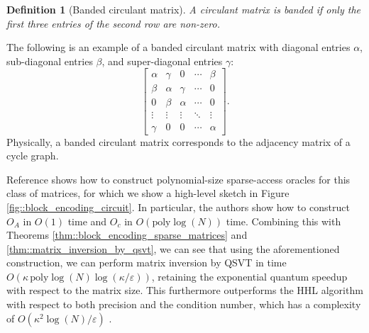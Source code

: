 \documentclass[10pt, twocolumn]{article}
\newtheorem{definition}[theorem]{Definition}
\begin{document}
\begin{definition}[Banded circulant matrix]
	A circulant matrix is banded if only the first three entries of the second row are non-zero.
\end{definition}

The following is an example of a banded circulant matrix with diagonal entries $\alpha$, sub-diagonal entries $\beta$, and super-diagonal entries $\gamma$:
\[
	\begin{bmatrix}
		\alpha & \gamma & 0 & \cdots & \beta \\
		\beta & \alpha & \gamma & \cdots & 0 \\
		0 & \beta & \alpha & \cdots & 0 \\
		\vdots & \vdots & \vdots & \ddots & \vdots \\
		\gamma & 0 & 0 & \cdots & \alpha
	\end{bmatrix}.
\]
Physically, a banded circulant matrix corresponds to the adjacency matrix of a cycle graph.

Reference \cite{camps2203explicit} shows how to construct polynomial-size sparse-access oracles for this class of matrices, for which we show a high-level sketch in Figure \ref{fig::block_encoding_circuit}. In particular, the authors show how to construct $O_A$ in $O(1)$ time and $O_c$ in $O(\text{poly}\log(N))$ time. Combining this with Theorems \ref{thm::block_encoding_sparse_matrices} and \ref{thm::matrix_inversion_by_qsvt}, we can see that using the aforementioned construction, we can perform matrix inversion by QSVT in time $O(\kappa \, \text{poly}\log(N) \log(\kappa / \varepsilon))$, retaining the exponential quantum speedup with respect to the matrix size. This furthermore outperforms the HHL algorithm with respect to both precision and the condition number, which has a complexity of $O(\kappa^2 \log(N) / \varepsilon)$ \cite{harrow2009quantum}.
\end{document}
